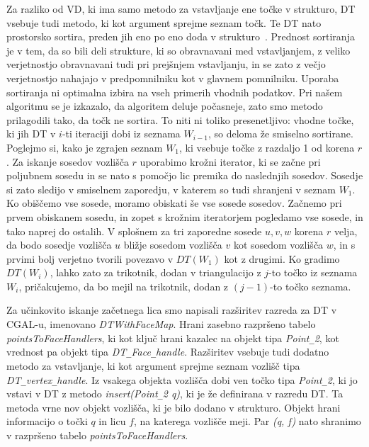 \documentclass[a4paper, 12pt]{book}
\newcommand{\U}{\texttt{\_}}
\begin{document}
Za razliko od VD, ki ima samo metodo za vstavljanje ene točke v strukturo, DT vsebuje tudi metodo, ki kot argument sprejme seznam točk. Te DT nato prostorsko sortira, preden jih eno po eno doda v strukturo~\cite{cgal:dd-ss-15a}. Prednost sortiranja je v tem, da so bili deli strukture, ki so obravnavani med vstavljanjem, z veliko verjetnostjo obravnavani tudi pri prejšnjem vstavljanju, in se zato z večjo verjetnostjo nahajajo v predpomnilniku kot v glavnem pomnilniku. Uporaba sortiranja ni optimalna izbira na vseh primerih vhodnih podatkov. Pri našem algoritmu se je izkazalo, da algoritem deluje počasneje, zato smo metodo prilagodili tako, da točk ne sortira. To niti ni toliko presenetljivo: vhodne točke, ki jih DT v $i$-ti iteraciji dobi iz seznama $W_{i-1}$, so deloma že smiselno sortirane. Poglejmo si, kako je zgrajen seznam $W_1$, ki vsebuje točke z razdaljo 1 od korena $r$. Za iskanje sosedov vozlišča $r$  uporabimo krožni iterator, ki se začne pri poljubnem sosedu in se nato s pomočjo lic premika do naslednjih sosedov. Sosedje si zato sledijo v smiselnem zaporedju, v katerem so tudi shranjeni v seznam $W_1$. Ko obiščemo vse sosede, moramo obiskati še vse sosede sosedov. Začnemo pri prvem obiskanem sosedu, in zopet s krožnim iteratorjem pogledamo vse sosede, in tako naprej do ostalih. V splošnem za tri zaporedne sosede $u, v, w$ korena $r$ velja, da bodo sosedje vozlišča $u$ bližje sosedom vozlišča $v$ kot sosedom vozlišča $w$, in s prvimi bolj verjetno tvorili povezavo v $DT(W_1)$ kot z drugimi. Ko gradimo $DT(W_i)$, lahko zato za trikotnik, dodan v triangulacijo z $j$-to točko iz seznama $W_i$, pričakujemo, da bo mejil na trikotnik, dodan z $(j-1)$-to točko seznama.

\bigbreak

Za učinkovito iskanje začetnega lica smo napisali razširitev razreda za DT v CGAL-u, imenovano \textit{DTWithFaceMap}. Hrani zasebno razpršeno tabelo \textit{pointsToFaceHandlers}, ki kot ključ hrani kazalec na objekt tipa \textit{Point\U 2}, kot vrednost pa objekt tipa \textit{DT\U Face\U handle}. Razširitev vsebuje tudi dodatno metodo za vstavljanje, ki kot argument sprejme seznam vozlišč tipa \textit{DT\U vertex\U handle}. Iz vsakega objekta vozlišča dobi ven točko tipa \textit{Point\U 2}, ki jo vstavi v DT z metodo \textit{insert(Point\U 2 q)}, ki je že definirana  v razredu DT. Ta metoda vrne nov objekt vozlišča, ki je bilo dodano v strukturo. Objekt hrani informacijo o točki $q$ in licu $f$, na katerega vozlišče meji. Par \textit{(q, f)} nato shranimo v razpršeno tabelo \textit{pointsToFaceHandlers}.
\end{document}
